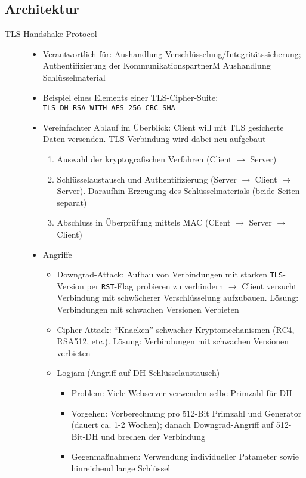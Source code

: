 \subsection{Architektur}
\begin{description}
	\item[TLS Handshake Protocol]\hfill
	\begin{itemize}
		\item Verantwortlich für: Aushandlung Verschlüsselung/Integritätssicherung; Authentifizierung der KommunikationspartnerM Aushandlung Schlüsselmaterial
		\item Beispiel eines Elements einer TLS-Cipher-Suite: \texttt{TLS\_DH\_RSA\_WITH\_AES\_256\_CBC\_SHA}
		\item Vereinfachter Ablauf im Überblick: Client will mit TLS gesicherte Daten versenden. TLS-Verbindung wird dabei neu aufgebaut
		\begin{enumerate}
			\item Auswahl der kryptografischen Verfahren (Client \(\rightarrow\) Server)
			\item Schlüsselaustausch und Authentifizierung (Server \(\rightarrow\) Client \(\rightarrow\) Server). Daraufhin Erzeugung des Schlüsselmaterials (beide Seiten separat)
			\item Abschluss in Überprüfung mittels MAC (Client \(\rightarrow\) Server \(\rightarrow\) Client)
		\end{enumerate}
		\item Angriffe
		\begin{itemize}
			\item Downgrad-Attack: Aufbau von Verbindungen mit starken \texttt{TLS}-Version per \texttt{RST}-Flag probieren zu verhindern \(\rightarrow\) Client versucht Verbindung mit schwächerer Verschlüsselung aufzubauen. Lösung: Verbindungen mit schwachen Versionen Verbieten
			\item Cipher-Attack: "`Knacken"' schwacher Kryptomechanismen (RC4, RSA512, etc.). Lösung: Verbindungen mit schwachen Versionen verbieten
			\item Logjam (Angriff auf DH-Schlüsselaustausch)
			\begin{itemize}
				\item Problem: Viele Webserver verwenden selbe Primzahl für DH
				\item Vorgehen: Vorberechnung pro 512-Bit Primzahl und Generator (dauert ca. 1-2 Wochen); danach Downgrad-Angriff auf 512-Bit-DH und brechen der Verbindung
				\item Gegenmaßnahmen: Verwendung individueller Patameter sowie hinreichend lange Schlüssel

\end{itemize}
\end{itemize}
\end{itemize}
\end{description}
